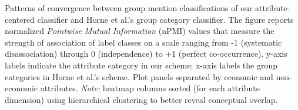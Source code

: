Patterns of convergence between group mention classifications of our attribute-centered classifier and Horne et al.'s group category classifier. The figure reports normalized \emph{Pointwise Mutual Information} (nPMI) values that measure the strength of association of label classes on a scale ranging from -1 (systematic disassociation) through 0 (independence) to +1 (perfect co-occurrence).  y-axis labels indicate the attribute category in our scheme; x-axis labels the group categories in Horne et al.'s scheme. Plot panels separated by economic and non-economic attributes. \emph{Note:} heatmap columns sorted (for each attribute dimension) using hierarchical clustering to better reveal conceptual overlap.